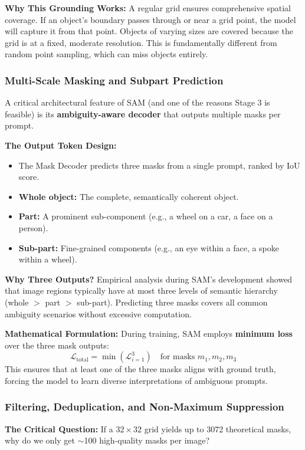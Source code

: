 \textbf{Why This Grounding Works:}
A regular grid ensures comprehensive spatial coverage. If an object's boundary passes through or near a grid point, the model will capture it from that point. Objects of varying sizes are covered because the grid is at a fixed, moderate resolution. This is fundamentally different from random point sampling, which can miss objects entirely.

\subsubsection{Multi-Scale Masking and Subpart Prediction}
A critical architectural feature of SAM (and one of the reasons Stage 3 is feasible) is its \textbf{ambiguity-aware decoder} that outputs multiple masks per prompt.

\textbf{The Output Token Design:}
\begin{itemize}
    \item The Mask Decoder predicts three masks from a single prompt, ranked by IoU score.
    \item \textbf{Whole object:} The complete, semantically coherent object.
    \item \textbf{Part:} A prominent sub-component (e.g., a wheel on a car, a face on a person).
    \item \textbf{Sub-part:} Fine-grained components (e.g., an eye within a face, a spoke within a wheel).
\end{itemize}

\textbf{Why Three Outputs?}
Empirical analysis during SAM's development showed that image regions typically have at most three levels of semantic hierarchy (whole $>$ part $>$ sub-part). Predicting three masks covers all common ambiguity scenarios without excessive computation.

\textbf{Mathematical Formulation:}
During training, SAM employs \textbf{minimum loss} over the three mask outputs:
\[
\mathcal{L}_{\text{total}} = \min(\mathcal{L}_{i=1}^3) \quad \text{for masks } m_1, m_2, m_3
\]
This ensures that at least one of the three masks aligns with ground truth, forcing the model to learn diverse interpretations of ambiguous prompts.

\subsubsection{Filtering, Deduplication, and Non-Maximum Suppression}
\textbf{The Critical Question:} If a $32 \times 32$ grid yields up to 3072 theoretical masks, why do we only get $\sim$100 high-quality masks per image?

